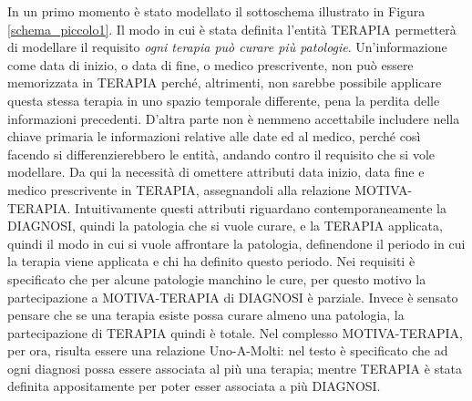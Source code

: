 \documentclass{article}
\begin{document}
In un primo momento è stato modellato il sottoschema illustrato in Figura
\ref{schema_piccolo1}.  Il modo in cui è stata definita l'entità TERAPIA
permetterà di modellare il requisito \textit{ogni terapia può curare più
patologie}.  Un'informazione come data di inizio, o data di fine, o medico
prescrivente, non può essere memorizzata in TERAPIA perché, altrimenti, non
sarebbe possibile applicare questa stessa terapia in uno spazio temporale
differente, pena la perdita delle informazioni precedenti. D'altra parte non è
nemmeno accettabile includere nella chiave primaria le informazioni relative
alle date ed al medico, perché così facendo si differenzierebbero le entità,
andando contro il requisito che si vole modellare.  Da qui la necessità di
omettere attributi data inizio, data fine e medico prescrivente in TERAPIA,
assegnandoli alla relazione MOTIVA-TERAPIA.  Intuitivamente questi attributi
riguardano contemporaneamente la DIAGNOSI, quindi la patologia che si vuole
curare, e la TERAPIA applicata, quindi il modo in cui si vuole affrontare la
patologia, definendone il periodo in cui la terapia viene applicata e chi ha
definito questo periodo.  Nei requisiti è specificato che per alcune patologie
manchino le cure, per questo motivo la partecipazione a MOTIVA-TERAPIA di
DIAGNOSI è parziale.  Invece è sensato pensare che se una terapia esiste possa
curare almeno una patologia, la partecipazione di TERAPIA quindi è totale.  Nel
complesso MOTIVA-TERAPIA, per ora, risulta essere una relazione Uno-A-Molti:
nel testo è specificato che ad ogni diagnosi possa essere associata al più una
terapia; mentre TERAPIA è stata definita appositamente per poter esser
associata a più DIAGNOSI.
\end{document}
